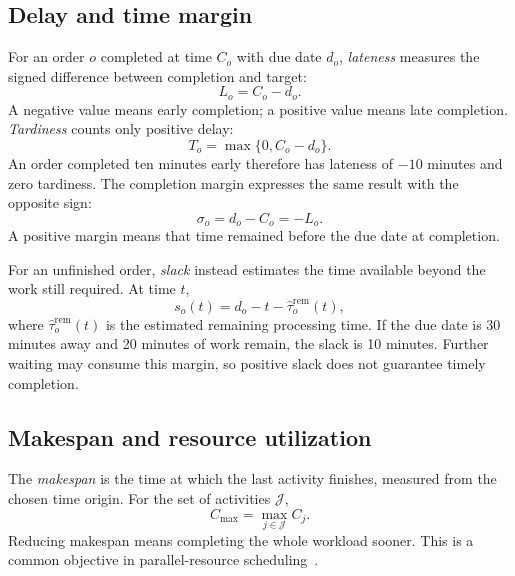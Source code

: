 \subsection{Delay and time margin}

For an order $o$ completed at time $C_o$ with due date $d_o$, \textit{lateness}
measures the signed difference between completion and target:
\begin{equation}
    L_o=C_o-d_o.
    \label{eq:order-lateness}
\end{equation}
A negative value means early completion; a positive value means late completion.
\textit{Tardiness} counts only positive delay:
\begin{equation}
    T_o=\max\{0,C_o-d_o\}.
    \label{eq:order-tardiness}
\end{equation}
An order completed ten minutes early therefore has lateness of $-10$ minutes
and zero tardiness. The completion margin expresses the same result with the
opposite sign:
\begin{equation}
    \sigma_o=d_o-C_o=-L_o.
    \label{eq:order-slack}
\end{equation}
A positive margin means that time remained before the due date at completion.

For an unfinished order, \textit{slack} instead estimates the time available
beyond the work still required. At time $t$,
\[
    s_o(t)=d_o-t-\widehat\tau_o^{\mathrm{rem}}(t),
\]
where $\widehat\tau_o^{\mathrm{rem}}(t)$ is the estimated remaining processing
time. If the due date is 30 minutes away and 20 minutes of work remain, the
slack is 10 minutes. Further waiting may consume this margin, so positive slack
does not guarantee timely completion.

\subsection{Makespan and resource utilization}

The \textit{makespan} is the time at which the last activity finishes,
measured from the chosen time origin. For the set of activities $\mathcal J$,
\begin{equation}
    C_{\max}=\max_{j\in\mathcal J}C_j.
    \label{eq:makespan-basic}
\end{equation}
Reducing makespan means completing the whole workload sooner. This is a common
objective in parallel-resource scheduling~\cite{leung2016processing}.

